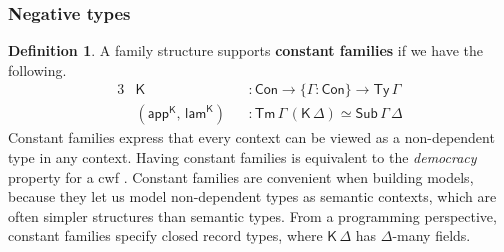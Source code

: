 \documentclass[12pt,a4paper,twoside,openany]{book}
\theoremstyle{remark}
\theoremstyle{definition}
\newtheorem{mydefinition}{Definition}
\newcommand{\Con}{\mathsf{Con}}
\newcommand{\Sub}{\mathsf{Sub}}
\newcommand{\Tm}{\mathsf{Tm}}
\newcommand{\Ty}{\mathsf{Ty}}
\newcommand{\lamK}{\mathsf{lam}^{\K}}
\newcommand{\appK}{\mathsf{app}^{\K}}
\newcommand{\K}{\mathsf{K}}
\begin{document}
\subsubsection{Negative types}

\begin{mydefinition}
\label{def:constant-families}
A family structure supports \textbf{constant families} if we have the following.
\begin{alignat*}{3}
  & \K &&: \Con \to \{\Gamma : \Con \} \to \Ty\,\Gamma \\
  & (\appK,\,\lamK) &&: \Tm\,\Gamma\,(\K\,\Delta) \simeq \Sub\,\Gamma\,\Delta
\end{alignat*}
Constant families express that every context can be viewed as a non-dependent
type in any context. Having constant families is equivalent to the
\emph{democracy} property for a cwf
\cite{clairambault2014biequivalence,forsberg-phd}.  Constant families are
convenient when building models, because they let us model non-dependent types
as semantic contexts, which are often simpler structures than semantic types.
From a programming perspective, constant families specify closed record types,
where $\K\,\Delta$ has $\Delta$-many fields.
\end{mydefinition}
\end{document}
